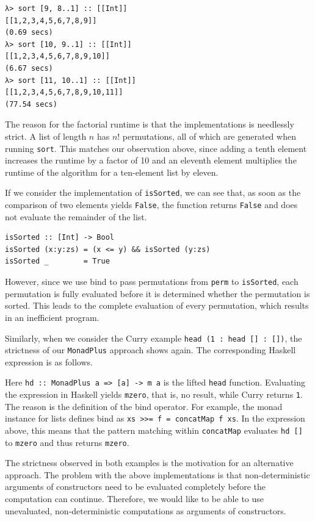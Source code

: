 \documentclass[a4paper, 11pt, fleqn, twoside]{scrreprt}
\newcommand{\hinl}[1]{\texttt{#1}}
\begin{document}
\begin{verbatim}
λ> sort [9, 8..1] :: [[Int]]
[[1,2,3,4,5,6,7,8,9]]
(0.69 secs)
λ> sort [10, 9..1] :: [[Int]]
[[1,2,3,4,5,6,7,8,9,10]]
(6.67 secs)
λ> sort [11, 10..1] :: [[Int]]
[[1,2,3,4,5,6,7,8,9,10,11]]
(77.54 secs)
\end{verbatim}

The reason for the factorial runtime is that the implementations is needlessly strict.
A list of length $n$  has $n!$ permutations, all of which are generated when running \hinl{sort}.
This matches our observation above, since adding a tenth element increases the runtime by a factor of 10 and an eleventh element multiplies the runtime of the algorithm for a ten-element list by eleven.

If we consider the implementation of \hinl{isSorted}, we can see that, as soon as the comparison of two elements yields \hinl{False}, the function returns \hinl{False} and does not evaluate the remainder of the list.

\begin{verbatim}
isSorted :: [Int] -> Bool
isSorted (x:y:zs) = (x <= y) && isSorted (y:zs)
isSorted _        = True
\end{verbatim}

However, since we use bind to pass permutations from \hinl{perm} to \hinl{isSorted}, each permutation is fully evaluated before it is determined whether the permutation is sorted.
This leads to the complete evaluation of every permutation, which results in an inefficient program.

Similarly, when we consider the Curry example \hinl{head (1 : head [] : [])}, the strictness of our \hinl{MonadPlus} approach shows again.
The corresponding Haskell expression is as follows.


Here \hinl{hd :: MonadPlus a => [a] -> m a} is the lifted \hinl{head} function.
Evaluating the expression in Haskell yields \hinl{mzero}, that is, no result, while Curry returns \hinl{1}.
The reason is the definition of the bind operator.
For example, the monad instance for lists defines bind as \hinl{xs >>= f = concatMap f xs}.
In the expression above, this means that the pattern matching within \hinl{concatMap} evaluates \hinl{hd []} to \hinl{mzero} and thus returns \hinl{mzero}.

The strictness observed in both examples is the motivation for an alternative approach.
The problem with the above implementations is that non-deterministic arguments of constructors need to be evaluated completely before the computation can continue.
Therefore, we would like to be able to use unevaluated, non-deterministic computations as arguments of constructors.
\end{document}
